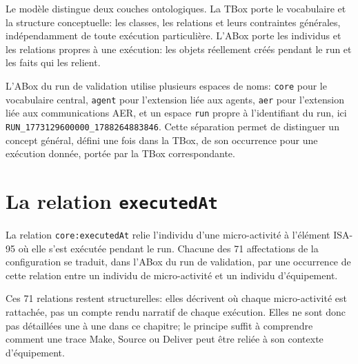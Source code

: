 Le modèle distingue deux couches ontologiques. La TBox porte le vocabulaire et la structure conceptuelle: les classes, les relations et leurs contraintes générales, indépendamment de toute exécution particulière. L'ABox porte les individus et les relations propres à une exécution: les objets réellement créés pendant le run et les faits qui les relient.


L'ABox du run de validation utilise plusieurs espaces de noms: \texttt{core} pour le vocabulaire central, \texttt{agent} pour l'extension liée aux agents, \texttt{aer} pour l'extension liée aux communications AER, et un espace \texttt{run} propre à l'identifiant du run, ici \texttt{RUN\_1773129600000\_1788264883846}. Cette séparation permet de distinguer un concept général, défini une fois dans la TBox, de son occurrence pour une exécution donnée, portée par la TBox correspondante.


\section{La relation \texttt{executedAt}}

La relation \texttt{core:executedAt} relie l'individu d'une micro-activité à l'élément ISA-95 où elle s'est exécutée pendant le run. Chacune des 71 affectations de la configuration se traduit, dans l'ABox du run de validation, par une occurrence de cette relation entre un individu de micro-activité et un individu d'équipement.

Ces 71 relations restent structurelles: elles décrivent où chaque micro-activité est rattachée, pas un compte rendu narratif de chaque exécution. Elles ne sont donc pas détaillées une à une dans ce chapitre; le principe suffit à comprendre comment une trace Make, Source ou Deliver peut être reliée à son contexte d'équipement.



